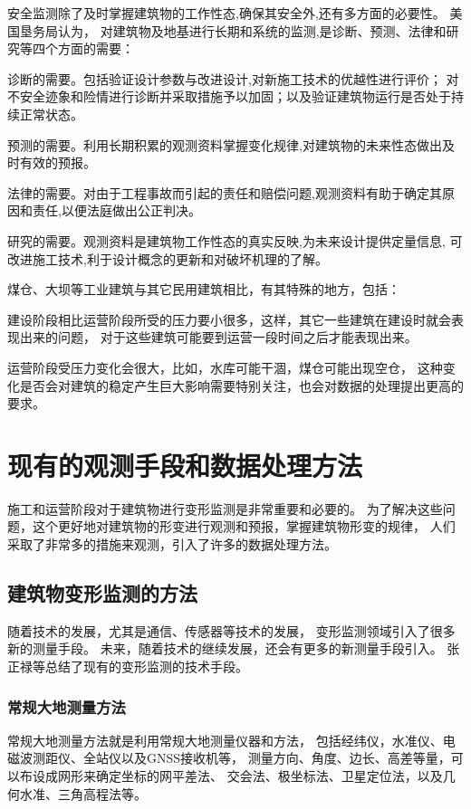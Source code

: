 安全监测除了及时掌握建筑物的工作性态,确保其安全外,还有多方面的必要性。
美国垦务局认为，
对建筑物及地基进行长期和系统的监测,是诊断、预测、法律和研究等四个方面的需要：
\begin{asparaitem}[$\bullet$]
\item 诊断的需要。包括验证设计参数与改进设计,对新施工技术的优越性进行评价；
对不安全迹象和险情进行诊断并采取措施予以加固；以及验证建筑物运行是否处于持续正常状态。
\item 预测的需要。利用长期积累的观测资料掌握变化规律,对建筑物的未来性态做出及时有效的预报。
\item 法律的需要。对由于工程事故而引起的责任和赔偿问题,观测资料有助于确定其原因和责任,以便法庭做出公正判决。
\item 研究的需要。观测资料是建筑物工作性态的真实反映,为未来设计提供定量信息,
可改进施工技术,利于设计概念的更新和对破坏机理的了解。
\end{asparaitem}

煤仓、大坝等工业建筑与其它民用建筑相比，有其特殊的地方，包括：
\begin{asparaitem}[$\bullet$]
\item 建设阶段相比运营阶段所受的压力要小很多，这样，其它一些建筑在建设时就会表现出来的问题，
对于这些建筑可能要到运营一段时间之后才能表现出来。
\item 运营阶段受压力变化会很大，比如，水库可能干涸，煤仓可能出现空仓，
这种变化是否会对建筑的稳定产生巨大影响需要特别关注，也会对数据的处理提出更高的要求。
\end{asparaitem}

\section{现有的观测手段和数据处理方法}
施工和运营阶段对于建筑物进行变形监测是非常重要和必要的。
为了解决这些问题，这个更好地对建筑物的形变进行观测和预报，掌握建筑物形变的规律，
人们采取了非常多的措施来观测，引入了许多的数据处理方法。

\subsection{建筑物变形监测的方法}
随着技术的发展，尤其是通信、传感器等技术的发展，
变形监测领域引入了很多新的测量手段。
未来，随着技术的继续发展，还会有更多的新测量手段引入。
张正禄等总结了现有的变形监测的技术手段。
\subsubsection*{常规大地测量方法}
常规大地测量方法就是利用常规大地测量仪器和方法，
包括经纬仪，水准仪、电磁波测距仪、全站仪以及GNSS接收机等，
测量方向、角度、边长、高差等量，可以布设成网形来确定坐标的网平差法、
交会法、极坐标法、卫星定位法，以及几何水准、三角高程法等。
